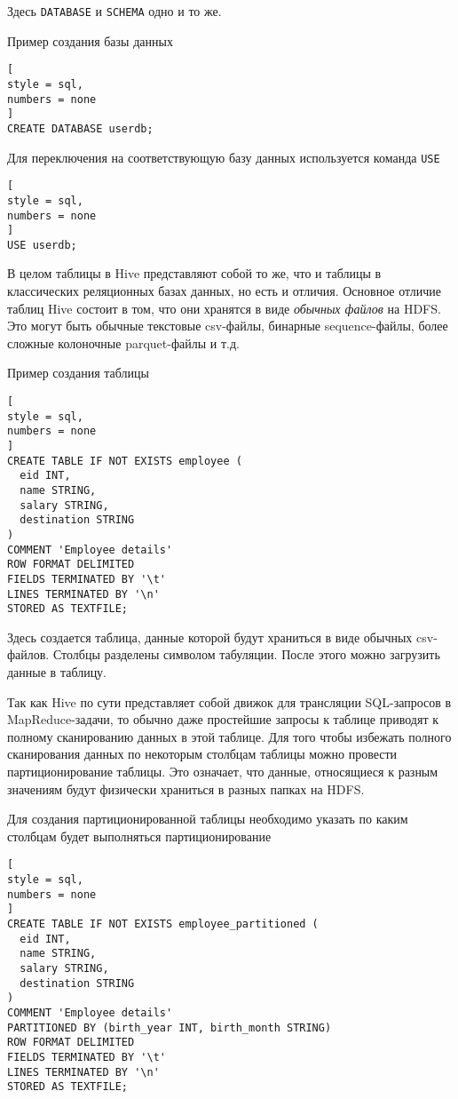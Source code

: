 \documentclass[%
	11pt,
	a4paper,
	utf8,
		]{article}
\begin{document}
Здесь \texttt{DATABASE} и \texttt{SCHEMA} одно и то же.

Пример создания базы данных
\begin{lstlisting}[
style = sql,
numbers = none	
]
CREATE DATABASE userdb;
\end{lstlisting}

Для переключения на соответствующую базу данных используется команда \texttt{USE}
\begin{lstlisting}[
style = sql,
numbers = none	
]
USE userdb;
\end{lstlisting}

В целом таблицы в Hive представляют собой то же, что и таблицы в классических реляционных базах данных, но есть и отличия. Основное отличие таблиц Hive состоит в том, что они хранятся в виде \emph{обычных файлов} на HDFS. Это могут быть обычные текстовые csv-файлы, бинарные sequence-файлы, более сложные колоночные parquet-файлы и т.д.

Пример создания таблицы
\begin{lstlisting}[
style = sql,
numbers = none	
]
CREATE TABLE IF NOT EXISTS employee (
  eid INT,
  name STRING,
  salary STRING,
  destination STRING
)
COMMENT 'Employee details'
ROW FORMAT DELIMITED
FIELDS TERMINATED BY '\t'
LINES TERMINATED BY '\n'
STORED AS TEXTFILE;
\end{lstlisting}

Здесь создается таблица, данные которой будут храниться в виде обычных csv-файлов. Столбцы разделены символом табуляции. После этого можно загрузить данные в таблицу.

Так как Hive по сути представляет собой движок для трансляции SQL-запросов в MapReduce-задачи, то обычно даже простейшие запросы к таблице приводят к полному сканированию данных в этой таблице. Для того чтобы избежать полного сканирования данных по некоторым столбцам таблицы можно провести партиционирование таблицы. Это означает, что данные, относящиеся к разным значениям будут физически храниться в разных папках на HDFS.

Для создания партиционированной таблицы необходимо указать по каким столбцам будет выполняться партиционирование
\begin{lstlisting}[
style = sql,
numbers = none
]
CREATE TABLE IF NOT EXISTS employee_partitioned (
  eid INT,
  name STRING,
  salary STRING,
  destination STRING
)
COMMENT 'Employee details'
PARTITIONED BY (birth_year INT, birth_month STRING)
ROW FORMAT DELIMITED
FIELDS TERMINATED BY '\t'
LINES TERMINATED BY '\n'
STORED AS TEXTFILE;
\end{lstlisting}
\end{document}
